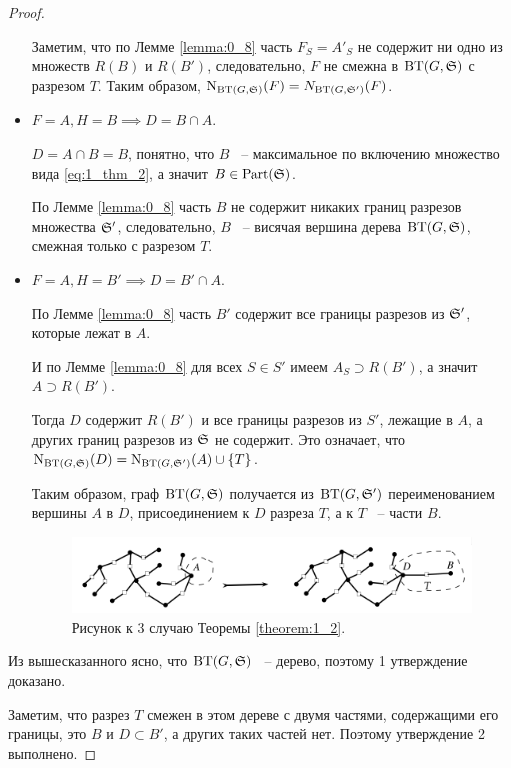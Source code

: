 \documentclass[../main.tex]{subfiles}
\begin{document}
\begin{proof}
\begin{itemize}
			Заметим, что по Лемме \ref{lemma:0_8} часть $F_S = A'_S$ не содержит ни одно из множеств $R(B)$ и $R(B')$, следовательно, $F$ не смежна в $\BT(G, \S)$ с разрезом $T$. Таким образом, $\N_{\BT(G, \S)}(F) = N_{\BT(G, \S')}(F)$.

		\item $F = A, H = B \implies D = B \cap A$.

			$D = A \cap B = B$, понятно, что $B$ ~-- максимальное по включению множество вида \eqref{eq:1_thm_2}, а значит $B \in \Part(\S)$.

			По Лемме \ref{lemma:0_8} часть $B$ не содержит никаких границ разрезов множества $\S'$, следовательно, $B$ ~-- висячая вершина дерева $\BT(G, \S)$, смежная только с разрезом $T$.

		\item $F = A, H = B' \implies D = B' \cap A$.

			По Лемме \ref{lemma:0_8} часть $B' $ содержит все границы разрезов из $\S'$, которые лежат в $A$.

			И по Лемме \ref{lemma:0_8} для всех $S \in S'$ имеем $A_S \supset R(B')$, а значит $A \supset R(B')$.

			Тогда $D$ содержит $R(B')$ и все границы разрезов из $S'$, лежащие в $A$, а других границ разрезов из $\S$ не содержит. Это означает, что $\N_{\BT(G, \S)}(D) = \N_{\BT(G, \S')}(A) \cup \{T\}$.

			Таким образом, граф $\BT(G, \S)$ получается из $\BT(G, \S')$ переименованием вершины $A$ в $D$, присоединением к $D$ разреза $T$, а к $T$ ~-- части $B$.

\begin{figure}[ht]
    \centering
	\includegraphics[width=0.6\columnwidth]{figures/theorem_1_2_case_3.png}
	\caption{Рисунок к 3 случаю Теоремы \ref{theorem:1_2}.}
    \label{fig:theorem_1_2_case_3}
\end{figure}

	\end{itemize}

	Из вышесказанного ясно, что $\BT(G, \S)$ ~-- дерево, поэтому 1 утверждение доказано.

	Заметим, что разрез $T$ смежен в этом дереве с двумя частями, содержащими его границы, это $B$ и $D \subset B'$, а других таких частей нет. Поэтому утверждение 2 выполнено.


\end{proof}
\end{document}
